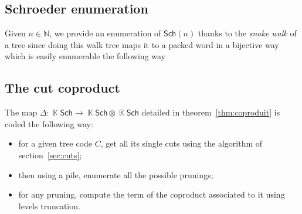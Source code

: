 \documentclass[a4paper,10pt]{amsart}
\DeclareMathOperator{\K}{\mathbb{K}}
\newcommand\Sch{\mathsf{Sch}}
\newcommand\NN{\mathbb{N}}
\newcommand{\Schw}{Schroeder} %
\theoremstyle{definition}
\begin{document}
\subsection{\Schw{} enumeration}

Given $n\in\NN$, we provide an enumeration of $\Sch(n)$ thanks to the \emph{snake walk} of a tree since doing this walk tree maps it to a packed word in a bijective way which is easily enumerable the following way

\subsection{The cut coproduct}

The map $\Delta:\K\Sch\rightarrow \K\Sch\otimes \K\Sch$ detailed in theorem~\ref{thm:coproduit} is coded the following way:
\begin{itemize}
	\item for a given tree code $C$, get all its single cuts using the algorithm of section~\ref{sec:cuts};
	\item then using a pile, enumerate all the possible prunings;
	\item for any pruning, compute the term of the coproduct associated to it using levels truncation.
\end{itemize}






\end{document}
